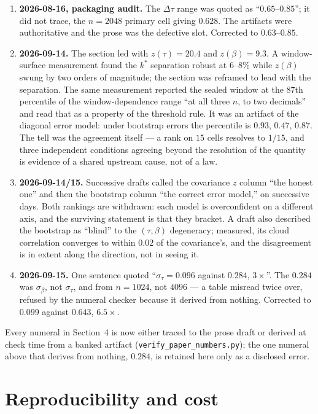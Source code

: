 \documentclass[11pt]{article}
\newcommand{\kstar}{k^{*}}
\begin{document}
\begin{enumerate}
\item \textbf{2026-08-16, packaging audit.} The $\Delta\tau$ range was quoted as
``$0.65$--$0.85$''; it did not trace, the $n=2048$ primary cell giving $0.628$. The artifacts
were authoritative and the prose was the defective slot. Corrected to $0.63$--$0.85$.
\item \textbf{2026-09-14.} The section led with $z(\tau)=20.4$ and $z(\beta)=9.3$. A
window-surface measurement found the $\kstar$ separation robust at $6$--$8\%$ while $z(\beta)$
swung by two orders of magnitude; the section was reframed to lead with the separation. The
same measurement reported the sealed window at the $87$th percentile of the window-dependence
range ``at all three $n$, to two decimals'' and read that as a property of the threshold
rule. It was an artifact of the diagonal error model: under bootstrap errors the percentile
is $0.93$, $0.47$, $0.87$. The tell was the agreement itself --- a rank on $15$ cells
resolves to $1/15$, and three independent conditions agreeing beyond the resolution of the
quantity is evidence of a shared upstream cause, not of a law.
\item \textbf{2026-09-14/15.} Successive drafts called the covariance $z$ column ``the honest
one'' and then the bootstrap column ``the correct error model,'' on successive days. Both
rankings are withdrawn: each model is overconfident on a different axis, and the surviving
statement is that they bracket. A draft also described the bootstrap as ``blind'' to the
$(\tau,\beta)$ degeneracy; measured, its cloud correlation converges to within $0.02$ of the
covariance's, and the disagreement is in extent along the direction, not in seeing it.
\item \textbf{2026-09-15.} One sentence quoted ``$\sigma_\tau=0.096$ against $0.284$, $3\times$''.
The $0.284$ was $\sigma_\beta$, not $\sigma_\tau$, and from $n=1024$, not $4096$ --- a table
misread twice over, refused by the numeral checker because it derived from nothing.
Corrected to $0.099$ against $0.643$, $6.5\times$.
\end{enumerate}

\noindent
Every numeral in Section~4 is now either traced to the prose draft or derived at check time
from a banked artifact (\texttt{verify\_paper\_numbers.py}); the one numeral above that
derives from nothing, $0.284$, is retained here only as a disclosed error.

\section{Reproducibility and cost}
\label{app:repro}
\end{document}
